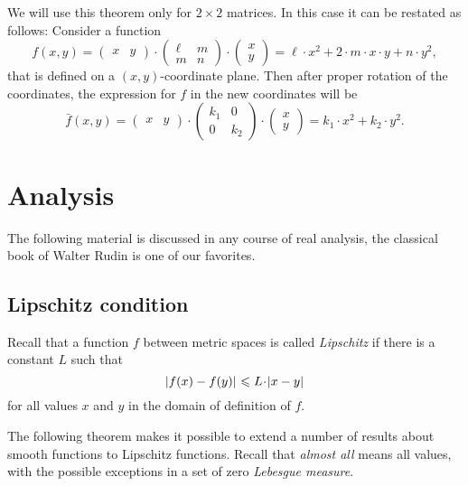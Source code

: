 We will use this theorem only for $2{\times}2$ matrices.
In this case it can be restated as follows:
Consider a function 
\[f(x,y)=
\begin{pmatrix}
x&y
\end{pmatrix}
\cdot
\begin{pmatrix}
\ell&m
\\
m&n
\end{pmatrix}
\cdot
\begin{pmatrix}
x\\y
\end{pmatrix}
=\ell\cdot x^2+2\cdot m\cdot x\cdot y+n\cdot y^2,\]
that is defined on a $(x,y)$-coordinate plane.
Then after proper rotation of the coordinates, 
the expression for $f$ in the new coordinates will be
\[\bar f(x,y)=
\begin{pmatrix}
x&y
\end{pmatrix}
\cdot
\begin{pmatrix}
k_1&0
\\
0&k_2
\end{pmatrix}
\cdot
\begin{pmatrix}
x\\y
\end{pmatrix}
=k_1\cdot x^2+k_2\cdot y^2.\]

\section{Analysis}\label{sec:analysis}

The following material is discussed in any course of real analysis, the classical book of Walter Rudin \cite{rudin} is one of our favorites.


\subsection*{Lipschitz condition}

Recall that a function $f$ between metric spaces is called \emph{Lipschitz} if there is a constant $L$ such that 
\[\dist{f(x)}{f(y)}{}\le L\cdot\dist{x}{y}{}\]
for all values $x$ and $y$ in the domain of definition of $f$.

The following theorem makes it possible to extend a number of results about smooth functions to Lipschitz functions.
Recall that {}\emph{almost all} means all values, with the possible exceptions in a set of zero {}\emph{Lebesgue measure}.

